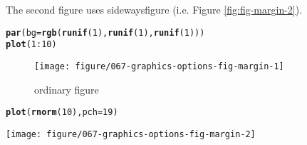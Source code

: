 \documentclass{article}\usepackage[]{graphicx}\usepackage[]{xcolor}
\makeatletter
\newcommand{\hlnum}[1]{\textcolor[rgb]{0.686,0.059,0.569}{#1}}%
\newcommand{\hlopt}[1]{\textcolor[rgb]{0,0,0}{#1}}%
\newcommand{\hldef}[1]{\textcolor[rgb]{0.345,0.345,0.345}{#1}}%
\newcommand{\hlkwc}[1]{\textcolor[rgb]{0.333,0.667,0.333}{#1}}%
\newcommand{\hlkwd}[1]{\textcolor[rgb]{0.737,0.353,0.396}{\textbf{#1}}}%
\newenvironment{kframe}{%
 \def\at@end@of@kframe{}%
 \ifinner\ifhmode%
  \def\at@end@of@kframe{\end{minipage}}%
  \begin{minipage}{\columnwidth}%
 \fi\fi%
 \def\FrameCommand##1{\hskip\@totalleftmargin \hskip-\fboxsep
 \colorbox{shadecolor}{##1}\hskip-\fboxsep
     \hskip-\linewidth \hskip-\@totalleftmargin \hskip\columnwidth}%
 \MakeFramed {\advance\hsize-\width
   \@totalleftmargin\z@ \linewidth\hsize
   \@setminipage}}%
 {\par\unskip\endMakeFramed%
 \at@end@of@kframe}
\newenvironment{knitrout}{}{} %
\makeatother
\begin{document}
The second figure uses sidewaysfigure (i.e. Figure \ref{fig:fig-margin-2}).

\begin{knitrout}
\color{fgcolor}\begin{kframe}
\begin{alltt}
\hlkwd{par}\hldef{(}\hlkwc{bg} \hldef{=} \hlkwd{rgb}\hldef{(}\hlkwd{runif}\hldef{(}\hlnum{1}\hldef{),} \hlkwd{runif}\hldef{(}\hlnum{1}\hldef{),} \hlkwd{runif}\hldef{(}\hlnum{1}\hldef{)))}
\hlkwd{plot}\hldef{(}\hlnum{1}\hlopt{:}\hlnum{10}\hldef{)}
\end{alltt}
\end{kframe}\begin{figure}[H]
\texttt{[image: figure/067-graphics-options-fig-margin-1]} \caption[ordinary figure]{ordinary figure}\label{fig:fig-margin-1}
\end{figure}

\begin{kframe}\begin{alltt}
\hlkwd{plot}\hldef{(}\hlkwd{rnorm}\hldef{(}\hlnum{10}\hldef{),} \hlkwc{pch} \hldef{=} \hlnum{19}\hldef{)}
\end{alltt}
\end{kframe}\begin{sidewaysfigure}[H]
\texttt{[image: figure/067-graphics-options-fig-margin-2]} \caption[sideways figure]{sideways figure}\label{fig:fig-margin-2}
\end{sidewaysfigure}

\end{knitrout}
\end{document}

